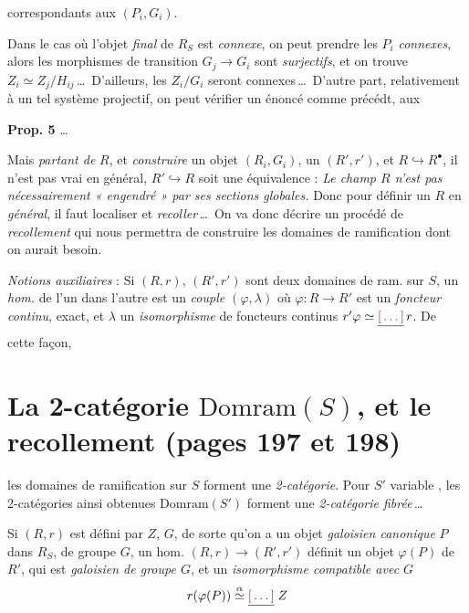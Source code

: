 \documentclass[11pt,a4paper]{article}
\begin{document}

correspondants aux $(P_i, G_i)$.

Dans le cas où l'objet \emph{final} de $R_S$ est \emph{connexe}, on peut
prendre les $P_i$ \emph{connexes}, alors les morphismes de transition
$G_j \to G_i$ sont \emph{surjectifs}, et on trouve
$Z_i \simeq Z_j / H_{ij}$\,\ldots\ D'ailleurs, les $Z_i/G_i$ seront
connexes\,\ldots\ D'autre part, relativement à un tel système projectif, on
peut vérifier un énoncé comme précédt, aux

\textbf{Prop. 5} \ldots

Mais \struck{\ill{}} \emph{partant de} $R$, et \emph{construire} un
\struck{\ill{}} objet $(R_i, G_i)$, \ill{} \ill{} un
 $(R', r')$, et $R \hookrightarrow R^{\bullet}$, il n'est
pas vrai en général,  $R' \hookrightarrow R$ soit une équivalence :
\emph{Le champ $R$ n'est pas nécessairement « engendré » par ses sections
globales.} Donc pour définir un $R$ en \emph{général}, il faut 
localiser et \emph{recoller}\,\ldots\ On va donc décrire un procédé de
\emph{recollement} qui nous permettra de construire les domaines de
ramification dont on aurait besoin.

\emph{Notions auxiliaires} : Si $(R, r)$, $(R', r')$ sont deux domaines de ram.
sur $S$, un \emph{hom.} de l'un dans l'autre est un \emph{couple
$(\varphi, \lambda)$}  où
$\varphi : R \longrightarrow R'$ est un \emph{foncteur continu}, exact, et
$\lambda$ un \emph{isomorphisme} de foncteurs continus
$r'\varphi \simeq \struck{\ill{}}\, r$. \struck{\ill{}} De cette façon,

\section*{La 2-catégorie $\mathrm{Domram}(S)$, et le recollement (pages 197 et 198)}


les domaines de ramification sur $S$ forment une
\emph{2-catégorie}. Pour $S'$ variable , les 2-catégories ainsi obtenues
$\mathrm{Domram}(S')$ forment une \emph{2-catégorie fibrée}\,\ldots

Si $(R, r)$ est défini par $Z$, $G$, de sorte qu'on a un objet
\emph{galoisien canonique} $P$ dans $R_S$, de groupe $G$, un
\struck{\ill{}} hom. $(R, r) \to (R', r')$ définit un objet $\varphi(P)$ de
$R'$, qui est \emph{galoisien de groupe $G$}, et un \emph{isomorphisme
compatible avec $G$}
\[
  r(\varphi(P)) \overset{\alpha}{\simeq} \struck{\ill{}}\; Z
\]
\end{document}
